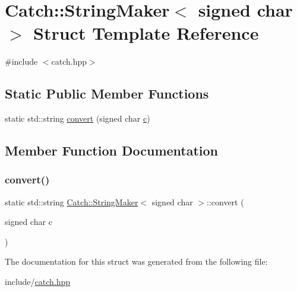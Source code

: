 \hypertarget{structCatch_1_1StringMaker_3_01signed_01char_01_4}{}\section{Catch\+:\+:String\+Maker$<$ signed char $>$ Struct Template Reference}
\label{structCatch_1_1StringMaker_3_01signed_01char_01_4}


{\ttfamily \#include $<$catch.\+hpp$>$}

\subsection*{Static Public Member Functions}
\begin{DoxyCompactItemize}
\item 
static std\+::string \mbox{\hyperlink{structCatch_1_1StringMaker_3_01signed_01char_01_4_a5ec41f32916539dc90130539db8222cf}{convert}} (signed char \mbox{\hyperlink{decoupage_8cpp_a4e1e0e72dd773439e333c84dd762a9c3}{c}})
\end{DoxyCompactItemize}


\subsection{Member Function Documentation}
\mbox{\label{structCatch_1_1StringMaker_3_01signed_01char_01_4_a5ec41f32916539dc90130539db8222cf}} 
\subsubsection{\texorpdfstring{convert()}{convert()}}
{\footnotesize\ttfamily static std\+::string \mbox{\hyperlink{structCatch_1_1StringMaker}{Catch\+::\+String\+Maker}}$<$ signed char $>$\+::convert (\begin{DoxyParamCaption}\item[{signed char}]{c }\end{DoxyParamCaption})\hspace{0.3cm}{\ttfamily [static]}}



The documentation for this struct was generated from the following file\+:\begin{DoxyCompactItemize}
\item 
include/\mbox{\hyperlink{catch_8hpp}{catch.\+hpp}}\end{DoxyCompactItemize}
